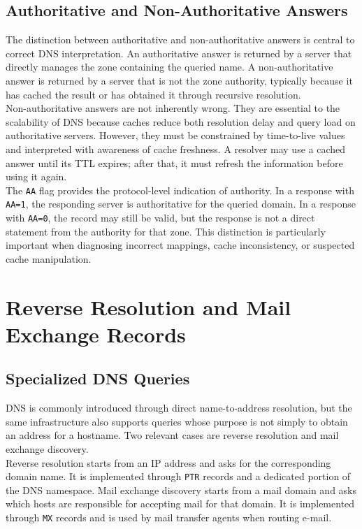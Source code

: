 \documentclass{scrbook}
\begin{document}
	\section{Authoritative and Non-Authoritative Answers}
	
	The distinction between authoritative and non-authoritative answers is central to correct DNS interpretation. An authoritative answer is returned by a server that directly manages the zone containing the queried name. A non-authoritative answer is returned by a server that is not the zone authority, typically because it has cached the result or has obtained it through recursive resolution.\\
	
	Non-authoritative answers are not inherently wrong. They are essential to the scalability of DNS because caches reduce both resolution delay and query load on authoritative servers. However, they must be constrained by time-to-live values and interpreted with awareness of cache freshness. A resolver may use a cached answer until its TTL expires; after that, it must refresh the information before using it again.\\
	
	The \texttt{AA} flag provides the protocol-level indication of authority. In a response with \texttt{AA=1}, the responding server is authoritative for the queried domain. In a response with \texttt{AA=0}, the record may still be valid, but the response is not a direct statement from the authority for that zone. This distinction is particularly important when diagnosing incorrect mappings, cache inconsistency, or suspected cache manipulation.
	
	\chapter{Reverse Resolution and Mail Exchange Records}
	
	\section{Specialized DNS Queries}
	
	DNS is commonly introduced through direct name-to-address resolution, but the same infrastructure also supports queries whose purpose is not simply to obtain an address for a hostname. Two relevant cases are reverse resolution and mail exchange discovery.\\
	
	Reverse resolution starts from an IP address and asks for the corresponding domain name. It is implemented through \texttt{PTR} records and a dedicated portion of the DNS namespace. Mail exchange discovery starts from a mail domain and asks which hosts are responsible for accepting mail for that domain. It is implemented through \texttt{MX} records and is used by mail transfer agents when routing e-mail.\\
	
\end{document}
